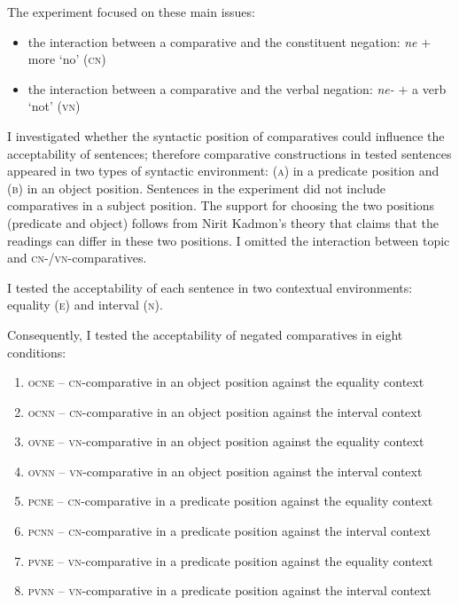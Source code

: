 \documentclass[output=paper,
]{langscibook}
\begin{document}
The experiment focused on these main issues:

\begin{itemize}
\item the interaction between a comparative and the constituent negation: \textit{ne} $+$ more `no' (\textsc{cn})
\item the interaction between a comparative and the verbal negation: \textit{ne-} $+$ a verb `not' (\textsc{vn}) 
\end{itemize}

\noindent I investigated whether the syntactic position of comparatives could influence the acceptability of sentences; therefore comparative constructions in tested sentences appeared in two types of syntactic environment: (\textsc{a}) in a predicate position and (\textsc{b}) in an object position. Sentences in the experiment did not include comparatives in a subject position. The support for choosing the two positions (predicate and object) follows from Nirit Kadmon's theory \citep{kadmon2001formal} that claims that the readings can differ in these two positions. I omitted the interaction between topic and \textsc{cn-/vn-}comparatives.

I tested the acceptability of each sentence in two contextual environments:  equality (\textsc{e}) and interval (\textsc{n}). 

Consequently, I tested the acceptability of negated comparatives in eight conditions:
\begin{enumerate}
\item \textsc{ocne} -- \textsc{cn-}comparative in an object position against the equality context \label{ex:item1}
\item \textsc{ocnn} -- \textsc{cn-}comparative in an object position against the interval context
\item \textsc{ovne} -- \textsc{vn-}comparative in an object position against the equality context
\item \textsc{ovnn} -- \textsc{vn-}comparative in an object position against the interval context
\item \textsc{pcne} -- \textsc{cn-}comparative in a predicate position against the equality context
\item \textsc{pcnn} -- \textsc{cn-}comparative in a predicate position against the interval context
\item \textsc{pvne} -- \textsc{vn-}comparative in a predicate position against the equality context
\item \textsc{pvnn} -- \textsc{vn-}comparative in a predicate position against the interval context \label{ex:item8}
\end{enumerate}
\end{document}
